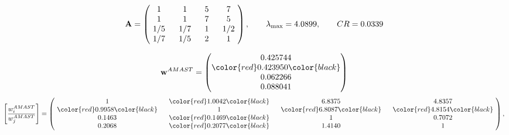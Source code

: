\begin{example}
\begin{equation*}
\mathbf{A} =
\begin{pmatrix}
$\,\,$ 1 $\,\,$ & $\,\,$1$\,\,$ & $\,\,$5$\,\,$ & $\,\,$7 $\,\,$ \\
$\,\,$ 1 $\,\,$ & $\,\,$ 1 $\,\,$ & $\,\,$7$\,\,$ & $\,\,$5 $\,\,$ \\
$\,\,$ 1/5$\,\,$ & $\,\,$ 1/7$\,\,$ & $\,\,$ 1 $\,\,$ & $\,\,$ 1/2 $\,\,$ \\
$\,\,$ 1/7$\,\,$ & $\,\,$ 1/5$\,\,$ & $\,\,$2$\,\,$ & $\,\,$ 1  $\,\,$ \\
\end{pmatrix},
\qquad
\lambda_{\max} =
4.0899,
\qquad
CR = 0.0339
\end{equation*}

\begin{equation*}
\mathbf{w}^{AMAST} =
\begin{pmatrix}
0.425744\\
\color{red} 0.423950\color{black} \\
0.062266\\
0.088041
\end{pmatrix}\end{equation*}
\begin{equation*}
\left[ \frac{{w}^{AMAST}_i}{{w}^{AMAST}_j} \right] =
\begin{pmatrix}
$\,\,$ 1 $\,\,$ & $\,\,$\color{red} 1.0042\color{black} $\,\,$ & $\,\,$6.8375$\,\,$ & $\,\,$4.8357$\,\,$ \\
$\,\,$\color{red} 0.9958\color{black} $\,\,$ & $\,\,$ 1 $\,\,$ & $\,\,$\color{red} 6.8087\color{black} $\,\,$ & $\,\,$\color{red} 4.8154\color{black}   $\,\,$ \\
$\,\,$0.1463$\,\,$ & $\,\,$\color{red} 0.1469\color{black} $\,\,$ & $\,\,$ 1 $\,\,$ & $\,\,$0.7072 $\,\,$ \\
$\,\,$0.2068$\,\,$ & $\,\,$\color{red} 0.2077\color{black} $\,\,$ & $\,\,$1.4140$\,\,$ & $\,\,$ 1  $\,\,$ \\
\end{pmatrix},
\end{equation*}


\end{example}
